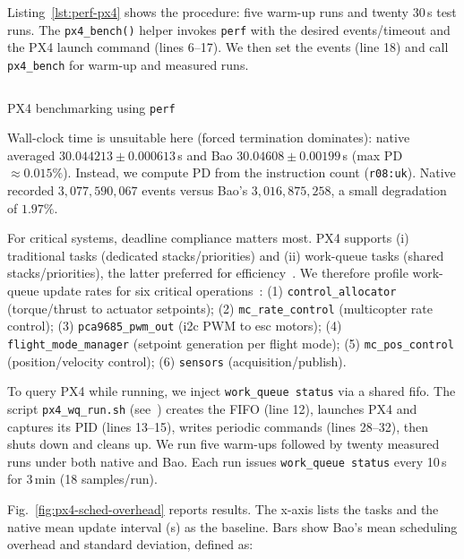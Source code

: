 Listing~\ref{lst:perf-px4} shows the procedure: five warm-up runs and twenty
30\,s test runs. The \lstinline{px4_bench()} helper invokes \lstinline{perf}
with the desired events/timeout and the PX4 launch command (lines 6--17). We
then set the events (line 18) and call \lstinline{px4_bench} for warm-up and
measured runs.

\begin{longlisting}
\centering
\inputminted[]{bash}{./listing/perfPX4.sh}
\caption{PX4 benchmarking using \texttt{perf}}
\label{lst:perf-px4}
\end{longlisting}

Wall-clock time is unsuitable here (forced termination dominates): native
averaged $30.044213 \pm 0.000613$\,s and Bao $30.04608 \pm 0.00199$\,s (max PD
$\approx 0.015\%$). Instead, we compute PD from the instruction count
(\lstinline{r08:uk}). Native recorded $3{,}077{,}590{,}067$ events versus Bao’s
$3{,}016{,}875{,}258$, a small degradation of $1.97\%$.

For critical systems, deadline compliance matters most. PX4 supports (i)
traditional tasks (dedicated stacks/priorities) and (ii) work-queue tasks
(shared stacks/priorities), the latter preferred for
efficiency~\cite{px4WorkQueue}. We therefore profile work-queue update rates for
six critical
operations~\cite{px4ModulesRefCtrl,px4ModulesRefDriver,px4ModulesRefSystem}:
(1) \lstinline{control_allocator} (torque/thrust to actuator setpoints);
(2) \lstinline{mc_rate_control} (multicopter rate control);
(3) \lstinline{pca9685_pwm_out} (\gls{i2c} PWM to \gls{esc} motors);
(4) \lstinline{flight_mode_manager} (setpoint generation per flight mode);
(5) \lstinline{mc_pos_control} (position/velocity control);
(6) \lstinline{sensors} (acquisition/publish).

To query PX4 while running, we inject \lstinline{work_queue status} via a shared
\gls{fifo}. The script \lstinline{px4_wq_run.sh} (see~\cite{thesis-sw-github})
creates the FIFO (line 12), launches PX4 and captures its PID (lines 13--15),
writes periodic commands (lines 28--32), then shuts down and cleans up. We run
five warm-ups followed by twenty measured runs under both native and Bao. Each
run issues \lstinline{work_queue status} every 10\,s for 3\,min (18
samples/run).

Fig.~\ref{fig:px4-sched-overhead} reports results. The x-axis lists the tasks
and the native mean update interval (\textmu s) as the baseline. Bars show Bao’s
mean scheduling overhead and standard deviation, defined as:

